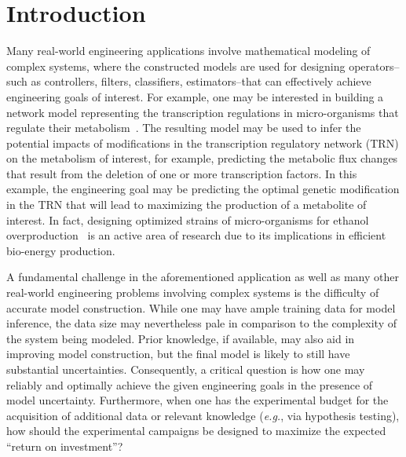 \documentclass{article}
\begin{document}
\section{Introduction}
\label{sec:introduction}
Many real-world engineering applications involve mathematical modeling of complex systems, where the constructed models are used for designing operators--such as controllers, filters, classifiers, estimators--that can effectively achieve engineering goals of interest. For example, one may be interested in building a network model representing the transcription regulations in micro-organisms that regulate their metabolism~\cite{Niu2021}. The resulting model may be used to infer the potential impacts of modifications in the transcription regulatory network (TRN) on the metabolism of interest, for example, predicting the metabolic flux changes that result from the deletion of one or more transcription factors. In this example, the engineering goal may be predicting the optimal genetic modification in the TRN that will lead to maximizing the production of a metabolite of interest. In fact, designing optimized strains of micro-organisms for ethanol overproduction~\cite{Shen2019} is an active area of research due to its implications in efficient bio-energy production.

A fundamental challenge in the aforementioned application as well as many other real-world engineering problems involving complex systems is the difficulty of accurate model construction. While one may have ample training data for model inference, the data size may nevertheless pale in comparison to the complexity of the system being modeled. Prior knowledge, if available, may also aid in improving model construction, but the final model is likely to still have substantial uncertainties. Consequently, a critical question is how one may reliably and optimally achieve the given engineering goals in the presence of model uncertainty. Furthermore, when one has the experimental budget for the acquisition of additional data or relevant knowledge (\textit{e.g.}, via hypothesis testing), how should the experimental campaigns be designed to maximize the expected ``return on investment''?
\end{document}
